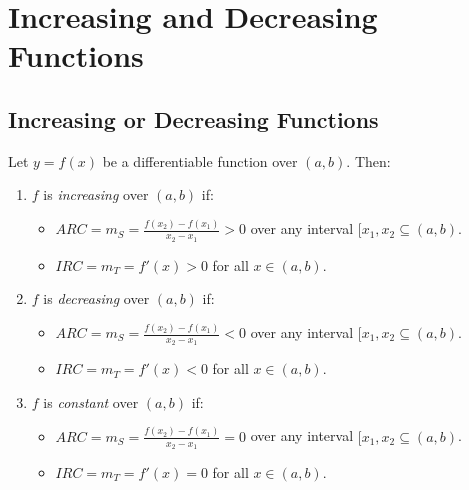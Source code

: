 \section{Increasing and Decreasing Functions}
\subsection{Increasing or Decreasing Functions}
	Let $y=f(x)$ be a differentiable function over $(a,b)$.
	Then:
	\begin{enumerate}
		\item $f$ is \emph{increasing} over $(a,b)$ if:
			\begin{itemize}
				\item $ARC = m_S = \frac{f(x_2) - f(x_1)}{x_2 - x_1} > 0$ over any interval $[x_1,x_2 \subseteq (a, b)$.
				\item $IRC = m_T = f'(x) > 0$ for all $x \in (a,b)$.
			\end{itemize}
		\item $f$ is \emph{decreasing} over $(a,b)$ if:
			\begin{itemize}
				\item $ARC = m_S = \frac{f(x_2) - f(x_1)}{x_2 - x_1} < 0$ over any interval $[x_1,x_2 \subseteq (a, b)$.
				\item $IRC = m_T = f'(x) < 0$ for all $x \in (a,b)$.
			\end{itemize}
		\item $f$ is \emph{constant} over $(a,b)$ if:
			\begin{itemize}
				\item $ARC = m_S = \frac{f(x_2) - f(x_1)}{x_2 - x_1} = 0$ over any interval $[x_1,x_2 \subseteq (a, b)$.
				\item $IRC = m_T = f'(x) = 0$ for all $x \in (a,b)$.
			\end{itemize}
	\end{enumerate}

